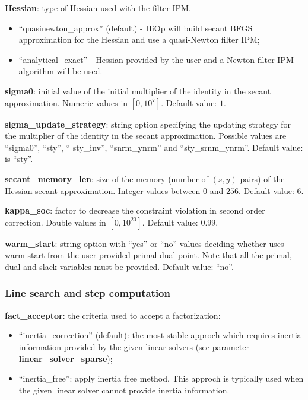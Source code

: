 \noindent \textbf{Hessian}: type of Hessian used with the filter IPM.
\begin{itemize}
\item ``quasinewton\_approx'' (default) - HiOp will build secant BFGS approximation for the Hessian and use a quasi-Newton filter IPM;
\item ``analytical\_exact'' - Hessian provided by the user and a Newton filter IPM algorithm will be used.
\end{itemize}
\medskip

\noindent \textbf{sigma0}: initial value of the initial multiplier of the identity in the secant approximation. Numeric values in $[0,10^7]$. Default value: $1$.
\medskip

\noindent \textbf{sigma\_update\_strategy}: string option specifying the updating strategy for the multiplier of the identity in the secant approximation. Possible values are ``sigma0'', ``sty'', `` sty\_inv'', ``snrm\_ynrm'' and ``sty\_srnm\_ynrm''. Default value: is ``sty''.
\medskip

\noindent \textbf{secant\_memory\_len}: size of the memory (number of $(s,y)$ pairs) of the Hessian secant approximation. Integer values between $0$ and $256$. Default value: $6$.
\medskip

\noindent \textbf{kappa\_soc}: factor to decrease the constraint violation in second order correction. Double values in $[0, 10^{20}]$. Default value: $0.99$.
\medskip

\noindent \textbf{warm\_start}: string option with ``yes'' or ``no'' values deciding whether \Hi uses warm start from the user provided primal-dual point. Note that all the primal, dual and slack variables must be provided. Default value: ``no''.
\medskip



\subsubsection{Line search and step computation}

\noindent \textbf{fact\_acceptor}: the criteria used to accept a factorization:
\begin{itemize}
\item ``inertia\_correction'' (default): the most stable approch which requires inertia information provided by the given linear solvers (see parameter \textbf{linear\_solver\_sparse}); 
\item ``inertia\_free'': apply inertia free method. This approch is typically used when the given linear solver cannot provide inertia information.
\end{itemize}
\medskip


